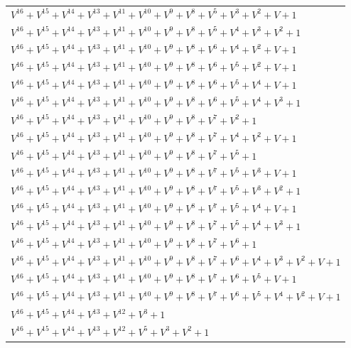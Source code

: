 \documentclass[12pt]{article}
\begin{document}
\begin{adjustwidth}{-4cm}{}
\begin{center}
\begin{longtable}{|l|}
$V^{16}  +V^{15}  +V^{14}  +V^{13}  +V^{11}  +V^{10}  +V^{9}  +V^{8}  +V^{5}  +V^{3}  +V^{2}  + V + 1$ \\
$V^{16}  +V^{15}  +V^{14}  +V^{13}  +V^{11}  +V^{10}  +V^{9}  +V^{8}  +V^{5}  +V^{4}  +V^{3}  +V^{2}  + 1$ \\
$V^{16}  +V^{15}  +V^{14}  +V^{13}  +V^{11}  +V^{10}  +V^{9}  +V^{8}  +V^{6}  +V^{4}  +V^{2}  + V + 1$ \\
$V^{16}  +V^{15}  +V^{14}  +V^{13}  +V^{11}  +V^{10}  +V^{9}  +V^{8}  +V^{6}  +V^{5}  +V^{2}  + V + 1$ \\
$V^{16}  +V^{15}  +V^{14}  +V^{13}  +V^{11}  +V^{10}  +V^{9}  +V^{8}  +V^{6}  +V^{5}  +V^{4}  + V + 1$ \\
$V^{16}  +V^{15}  +V^{14}  +V^{13}  +V^{11}  +V^{10}  +V^{9}  +V^{8}  +V^{6}  +V^{5}  +V^{4}  +V^{3}  + 1$ \\
$V^{16}  +V^{15}  +V^{14}  +V^{13}  +V^{11}  +V^{10}  +V^{9}  +V^{8}  +V^{7}  +V^{2}  + 1$ \\
$V^{16}  +V^{15}  +V^{14}  +V^{13}  +V^{11}  +V^{10}  +V^{9}  +V^{8}  +V^{7}  +V^{4}  +V^{2}  + V + 1$ \\
$V^{16}  +V^{15}  +V^{14}  +V^{13}  +V^{11}  +V^{10}  +V^{9}  +V^{8}  +V^{7}  +V^{5}  + 1$ \\
$V^{16}  +V^{15}  +V^{14}  +V^{13}  +V^{11}  +V^{10}  +V^{9}  +V^{8}  +V^{7}  +V^{5}  +V^{3}  + V + 1$ \\
$V^{16}  +V^{15}  +V^{14}  +V^{13}  +V^{11}  +V^{10}  +V^{9}  +V^{8}  +V^{7}  +V^{5}  +V^{3}  +V^{2}  + 1$ \\
$V^{16}  +V^{15}  +V^{14}  +V^{13}  +V^{11}  +V^{10}  +V^{9}  +V^{8}  +V^{7}  +V^{5}  +V^{4}  + V + 1$ \\
$V^{16}  +V^{15}  +V^{14}  +V^{13}  +V^{11}  +V^{10}  +V^{9}  +V^{8}  +V^{7}  +V^{5}  +V^{4}  +V^{3}  + 1$ \\
$V^{16}  +V^{15}  +V^{14}  +V^{13}  +V^{11}  +V^{10}  +V^{9}  +V^{8}  +V^{7}  +V^{6}  + 1$ \\
$V^{16}  +V^{15}  +V^{14}  +V^{13}  +V^{11}  +V^{10}  +V^{9}  +V^{8}  +V^{7}  +V^{6}  +V^{4}  +V^{3}  +V^{2}  + V + 1$ \\
$V^{16}  +V^{15}  +V^{14}  +V^{13}  +V^{11}  +V^{10}  +V^{9}  +V^{8}  +V^{7}  +V^{6}  +V^{5}  + V + 1$ \\
$V^{16}  +V^{15}  +V^{14}  +V^{13}  +V^{11}  +V^{10}  +V^{9}  +V^{8}  +V^{7}  +V^{6}  +V^{5}  +V^{4}  +V^{2}  + V + 1$ \\
$V^{16}  +V^{15}  +V^{14}  +V^{13}  +V^{12}  +V^{3}  + 1$ \\
$V^{16}  +V^{15}  +V^{14}  +V^{13}  +V^{12}  +V^{5}  +V^{3}  +V^{2}  + 1$ \\

\end{longtable}
\end{center}
\end{adjustwidth}
\end{document}

